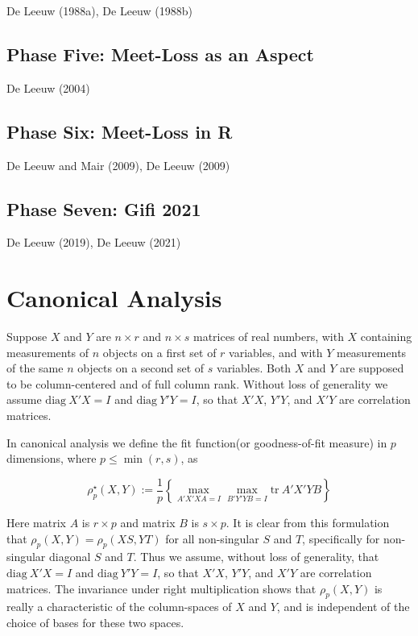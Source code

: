 \documentclass[
  12pt,
]{article}
\begin{document}
De Leeuw (1988a), De Leeuw (1988b)

\hypertarget{phase-five-meet-loss-as-an-aspect}{%
\subsection{Phase Five: Meet-Loss as an Aspect}\label{phase-five-meet-loss-as-an-aspect}}

De Leeuw (2004)

\hypertarget{phase-six-meet-loss-in-r}{%
\subsection{Phase Six: Meet-Loss in R}\label{phase-six-meet-loss-in-r}}

De Leeuw and Mair (2009), De Leeuw (2009)

\hypertarget{phase-seven-gifi-2021}{%
\subsection{Phase Seven: Gifi 2021}\label{phase-seven-gifi-2021}}

De Leeuw (2019), De Leeuw (2021)

\hypertarget{canonical-analysis}{%
\section{Canonical Analysis}\label{canonical-analysis}}

Suppose \(X\) and \(Y\) are \(n\times r\) and \(n\times s\) matrices of real numbers, with \(X\) containing measurements of \(n\) objects on a first set of \(r\) variables, and with \(Y\) measurements of the same \(n\) objects on a second set of \(s\) variables. Both \(X\) and \(Y\) are supposed to be column-centered and of full column rank. Without loss of generality we assume \(\text{diag}\ X'X=I\) and \(\text{diag}\ Y'Y=I\), so that \(X'X\), \(Y'Y\), and \(X'Y\) are correlation matrices.

In canonical analysis we define the fit function(or goodness-of-fit measure) in \(p\) dimensions, where \(p\leq\min(r,s)\), as

\begin{equation}
\rho_p^\star(X,Y):=\frac{1}{p}\left\{\max_{A'X'XA=I}\max_{B'Y'YB=I}\text{tr}\ A'X'YB\right\}
\label{eq:cancor}
\end{equation}

Here matrix \(A\) is \(r\times p\) and matrix \(B\) is \(s\times p\). It is clear from this formulation that \(\rho_p(X,Y)=\rho_p(XS,YT)\)
for all non-singular \(S\) and \(T\), specifically for non-singular diagonal \(S\) and \(T\). Thus we assume, without loss of generality, that \(\text{diag}\ X'X=I\) and \(\text{diag}\ Y'Y=I\), so that \(X'X\), \(Y'Y\), and \(X'Y\) are correlation matrices. The invariance under right multiplication shows that \(\rho_p(X,Y)\) is really a characteristic of the column-spaces of \(X\) and \(Y\), and is independent of the choice of bases for these two spaces.
\end{document}
